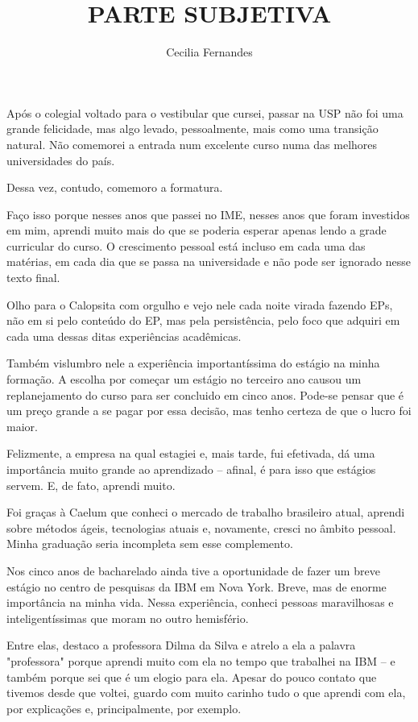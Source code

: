 \documentclass[titlepage,a4paper]{article}
\title{PARTE SUBJETIVA}
\author{Cecilia Fernandes}
\newcommand{\calopsita}{Calopsita}
\begin{document}
\maketitle

Após o colegial voltado para o vestibular que cursei, passar na USP não foi uma grande felicidade, mas algo levado, pessoalmente, mais como uma transição natural. Não comemorei a entrada num excelente curso numa das melhores universidades do país.

Dessa vez, contudo, comemoro a formatura.

Faço isso porque nesses anos que passei no IME, nesses anos que foram investidos em mim, aprendi muito mais do que se poderia esperar apenas lendo a grade curricular do curso. O crescimento pessoal está incluso em cada uma das matérias, em cada dia que se passa na universidade e não pode ser ignorado nesse texto final.

Olho para o \calopsita{} com orgulho e vejo nele cada noite virada fazendo EPs, não em si pelo conteúdo do EP, mas pela persistência, pelo foco que adquiri em cada uma dessas ditas experiências acadêmicas.

Também vislumbro nele a experiência importantíssima do estágio na minha formação. A escolha por começar um estágio no terceiro ano causou um replanejamento do curso para ser concluido em cinco anos. Pode-se pensar que é um preço grande a se pagar por essa decisão, mas tenho certeza de que o lucro foi maior.

Felizmente, a empresa na qual estagiei e, mais tarde, fui efetivada, dá uma importância muito grande ao aprendizado -- afinal, é para isso que estágios servem. E, de fato, aprendi muito.

Foi graças à Caelum que conheci o mercado de trabalho brasileiro atual, aprendi sobre métodos ágeis, tecnologias atuais e, novamente, cresci no âmbito pessoal. Minha graduação seria incompleta sem esse complemento.

Nos cinco anos de bacharelado ainda tive a oportunidade de fazer um breve estágio no centro de pesquisas da IBM em Nova York. Breve, mas de enorme importância na minha vida. Nessa experiência, conheci pessoas maravilhosas e inteligentíssimas que moram no outro hemisfério.

Entre elas, destaco a professora Dilma da Silva e atrelo a ela a palavra "professora" porque aprendi muito com ela no tempo que trabalhei na IBM -- e também porque sei que é um elogio para ela. Apesar do pouco contato que tivemos desde que voltei, guardo com muito carinho tudo o que aprendi com ela, por explicações e, principalmente, por exemplo.
\end{document}
